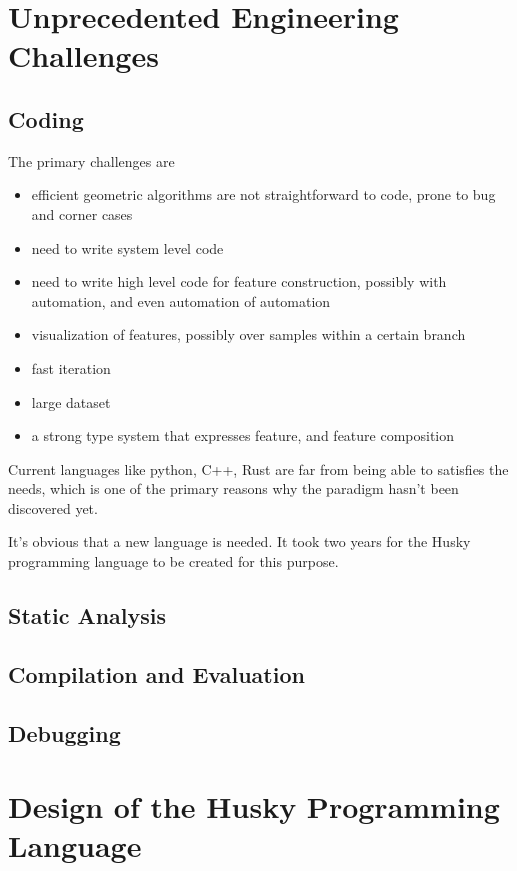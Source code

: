 \documentclass[11pt]{article} 	%
\theoremstyle{definition}
\begin{document}
\section{Unprecedented Engineering Challenges}

\subsection{Coding}

The primary challenges are

\begin{itemize}
	\item efficient geometric algorithms are not straightforward to code, prone to bug and corner cases
	\item need to write system level code
	\item need to write high level code for feature construction, possibly with automation, and even automation of automation
	\item visualization of features, possibly over samples within a certain branch
	\item fast iteration
	\item large dataset
	\item a strong type system that expresses feature, and feature composition
\end{itemize}

Current languages like python, C++, Rust are far from being able to satisfies the needs, which is one of the primary reasons why the paradigm hasn't been discovered yet.

It's obvious that a new language is needed. It took two years for the Husky programming language to be created for this purpose.

\subsection{Static Analysis}

\subsection{Compilation and Evaluation}

\subsection{Debugging}


\section{Design of the Husky Programming Language}
\end{document}
